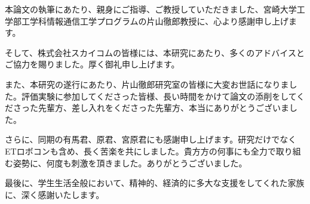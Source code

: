 \acknowledgment

本論文の執筆にあたり、親身にご指導、ご教授していただきました、宮崎大学工学部工学科情報通信工学プログラムの片山徹郎教授に、心より感謝申し上げます。

そして、株式会社スカイコムの皆様には、本研究にあたり、多くのアドバイスとご協力を賜りました。厚く御礼申し上げます。

また、本研究の遂行にあたり、片山徹郎研究室の皆様に大変お世話になりました。評価実験に参加してくださった皆様、長い時間をかけて論文の添削をしてくださった先輩方、差し入れをくださった先輩方、本当にありがとうございました。

さらに、同期の有馬君、原君、宮原君にも感謝申し上げます。研究だけでなくETロボコンも含め、長く苦楽を共にしました。貴方方の何事にも全力で取り組む姿勢に、何度も刺激を頂きました。ありがとうございました。

最後に、学生生活全般において、精神的、経済的に多大な支援をしてくれた家族に、深く感謝いたします。
